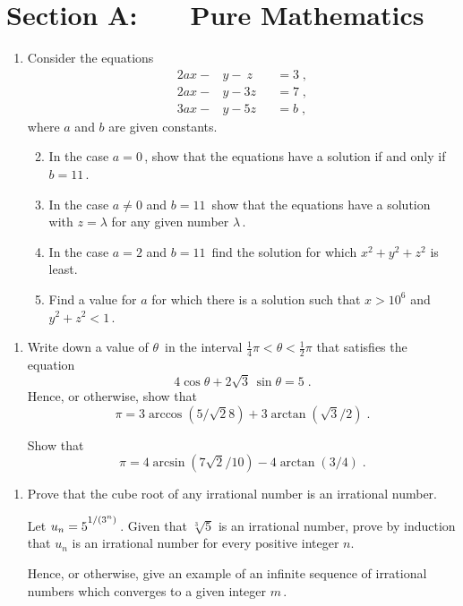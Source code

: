 \documentclass[a4, 11pt]{report}
\newlength{\qspace}
\newcounter{qnumber}
\newenvironment{question}%
 {\vspace{\qspace}
  \begin{enumerate}[\bfseries 1\quad][10]%
    \setcounter{enumi}{\value{qnumber}}%
    \item%
 }
{
  \end{enumerate}
  \filbreak
  \stepcounter{qnumber}
 }
\newenvironment{questionparts}[1][1]%
 {
  \begin{enumerate}[\bfseries (i)]%
    \setcounter{enumii}{#1}
    \addtocounter{enumii}{-1}
    \setlength{\itemsep}{5mm}
    \setlength{\parskip}{8pt}
 }
 {
  \end{enumerate}
 }
\newcommand{\ds}{\displaystyle}
\begin{document}
\setcounter{page}{2}

 
\section*{Section A: \ \ \ Pure Mathematics}

\begin{question}
Consider the equations
\begin{alignat*}{2}
ax-&y- \ z  && =3 \;,\\
2ax -&y -3z && = 7 \;,\\
3ax-&y-5z   && =b \;,
\end{alignat*}
where $a$ and $b$ are given constants.
\begin{questionparts}
\item In the case $a=0\,$, show that the equations have a solution if and only if
$b=11\,$.
\item In the case $a\ne0$ and $b=11\,$ show that the equations have
a solution with $z=\lambda$ for any given number $\lambda\,$.
\item  In the case $a=2$ and $b=11\,$ find the solution
for which $x^2+y^2+z^2$ is least.
\item Find a value for $a$ for which there is a solution such that
$x>10^6$ and $y^2+z^2<1\,$.
\end{questionparts}
\end{question}

\begin{question}
 Write down a value of $\theta\,$ in the interval $\frac{1}{4}\pi< \theta <\frac{1}{2}\pi$ that satisfies
the  equation
\[
             4\cos\theta+ 2\sqrt3\, \sin\theta = 5 \;.
\]
Hence, or otherwise,  show that
\[
         \pi=3\arccos(5/\sqrt28) + 3\arctan(\sqrt3/2)\;.
\]

Show that
\[
         \pi=4\arcsin(7\sqrt2/10) - 4\arctan(3/4)\;.
\]
\end{question}

\begin{question}
Prove that the cube root of any irrational number is an
irrational number.

Let $\ds u_n = {5\vphantom{\dot A}}^{1/{(3^n)}}\,$.
Given that $\sqrt[3]5$ is an irrational number, prove by
induction that
$u_n$ is an irrational number 
for every positive integer $n$.

Hence, or otherwise, give an example of  an infinite sequence
of irrational numbers which converges to a given  integer $m\,$.



\end{question}
\end{document}
